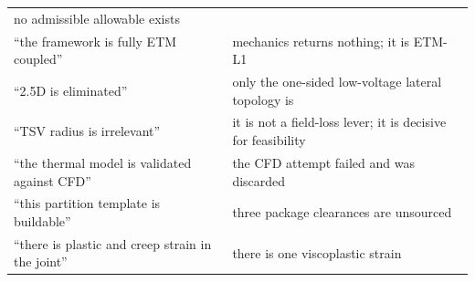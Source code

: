 \documentclass[10pt,]{article}
\begin{document}
\begin{longtable}[]{@{}ll@{}}
\begin{minipage}[t]{0.47\columnwidth}
no admissible allowable exists\strut
\end{minipage}\tabularnewline
\begin{minipage}[t]{0.47\columnwidth}\raggedright
``the framework is fully ETM coupled''\strut
\end{minipage} & \begin{minipage}[t]{0.47\columnwidth}\raggedright
mechanics returns nothing; it is ETM-L1\strut
\end{minipage}\tabularnewline
\begin{minipage}[t]{0.47\columnwidth}\raggedright
``2.5D is eliminated''\strut
\end{minipage} & \begin{minipage}[t]{0.47\columnwidth}\raggedright
only the one-sided low-voltage lateral topology is\strut
\end{minipage}\tabularnewline
\begin{minipage}[t]{0.47\columnwidth}\raggedright
``TSV radius is irrelevant''\strut
\end{minipage} & \begin{minipage}[t]{0.47\columnwidth}\raggedright
it is not a field-loss lever; it is decisive for feasibility\strut
\end{minipage}\tabularnewline
\begin{minipage}[t]{0.47\columnwidth}\raggedright
``the thermal model is validated against CFD''\strut
\end{minipage} & \begin{minipage}[t]{0.47\columnwidth}\raggedright
the CFD attempt failed and was discarded\strut
\end{minipage}\tabularnewline
\begin{minipage}[t]{0.47\columnwidth}\raggedright
``this partition template is buildable''\strut
\end{minipage} & \begin{minipage}[t]{0.47\columnwidth}\raggedright
three package clearances are unsourced\strut
\end{minipage}\tabularnewline
\begin{minipage}[t]{0.47\columnwidth}\raggedright
``there is plastic and creep strain in the joint''\strut
\end{minipage} & \begin{minipage}[t]{0.47\columnwidth}\raggedright
there is one viscoplastic strain\strut
\end{minipage}\tabularnewline
\bottomrule
\end{longtable}
\end{document}
